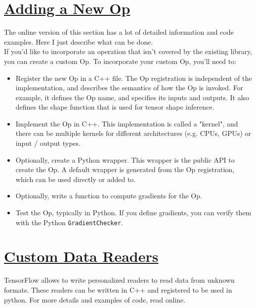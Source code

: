\documentclass[11pt,a4paper]{article}
\begin{document}
\section{\href{www.tensorflow.org/versions/r0.11/how_tos/adding_an_op/index.html}{Adding a New Op}}
The online version of this section has a lot of detailed information and code examples. Here I just describe what can be done. \\
If you'd like to incorporate an operation that isn't covered by the existing library, you can create a custom Op. To incorporate your custom Op, you'll need to:
\begin{itemize}
	\item Register the new Op in a C++ file. The Op registration is independent of the implementation, and describes the semantics of how the Op is invoked. For example, it defines the Op name, and specifies its inputs and outputs. It also defines the shape function that is used for tensor shape inference.
	\item Implement the Op in C++. This implementation is called a "kernel", and there can be multiple kernels for different architectures (e.g. CPUs, GPUs) or input / output types.
	\item Optionally, create a Python wrapper. This wrapper is the public API to create the Op. A default wrapper is generated from the Op registration, which can be used directly or added to.
	\item Optionally, write a function to compute gradients for the Op.
	\item Test the Op, typically in Python. If you define gradients, you can verify them with the Python \texttt{GradientChecker}.
\end{itemize}

\section{\href{www.tensorflow.org/versions/r0.11/how_tos/new_data_formats/index.html}{Custom Data Readers}}
TensorFlow allows to write personalized readers to read data from unknown formats. These readers can be written in C++ and registered to be used in python. For more details and examples of code, read online. 
\end{document}
